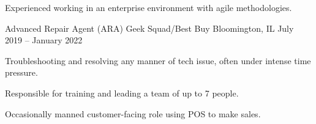 \documentclass[]{awesome-cv}
\begin{document}
\begin{cventries}
{\begin{cvitems}
      \item {Experienced working in an enterprise environment with agile methodologies.}
      \end{cvitems}
    }
	\cventry
	{Advanced Repair Agent (ARA)}
	{Geek Squad/Best Buy}
	{Bloomington, IL}
	{July 2019 – January 2022}
	{\begin{cvitems}
      \item {Troubleshooting and resolving any manner of tech issue, often under intense time pressure.}
      \item {Responsible for training and leading a team of up to 7 people.}
      \item {Occasionally manned customer-facing role using POS to make sales.}
		\end{cvitems}}
\end{cventries}
\end{document}
